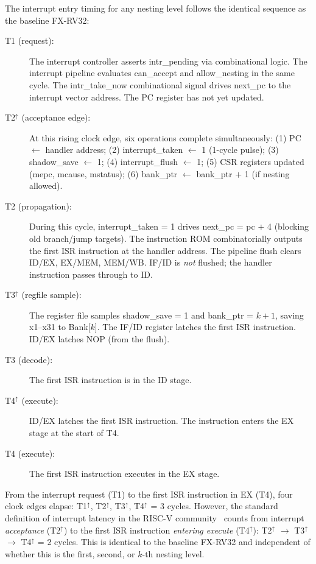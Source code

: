 \documentclass[letterpaper,journal]{IEEEtran}
\begin{document}
The interrupt entry timing for any nesting level follows the identical sequence as the baseline FX-RV32:

\begin{description}
\item[T1 (request):] The interrupt controller asserts intr\_pending via combinational logic. The interrupt pipeline evaluates can\_accept and allow\_nesting in the same cycle. The intr\_take\_now combinational signal drives next\_pc to the interrupt vector address. The PC register has not yet updated.

\item[T2$^\uparrow$ (acceptance edge):] At this rising clock edge, six operations complete simultaneously: (1) PC $\leftarrow$ handler address; (2) interrupt\_taken $\leftarrow$ 1 (1-cycle pulse); (3) shadow\_save $\leftarrow$ 1; (4) interrupt\_flush $\leftarrow$ 1; (5) CSR registers updated (mepc, mcause, mstatus); (6) bank\_ptr $\leftarrow$ bank\_ptr $+$ 1 (if nesting allowed).

\item[T2 (propagation):] During this cycle, interrupt\_taken = 1 drives next\_pc = pc $+$ 4 (blocking old branch/jump targets). The instruction ROM combinatorially outputs the first ISR instruction at the handler address. The pipeline flush clears ID/EX, EX/MEM, MEM/WB. IF/ID is \emph{not} flushed; the handler instruction passes through to ID.

\item[T3$^\uparrow$ (regfile sample):] The register file samples shadow\_save = 1 and bank\_ptr = $k+1$, saving x1--x31 to Bank[$k$]. The IF/ID register latches the first ISR instruction. ID/EX latches NOP (from the flush).

\item[T3 (decode):] The first ISR instruction is in the ID stage.

\item[T4$^\uparrow$ (execute):] ID/EX latches the first ISR instruction. The instruction enters the EX stage at the start of T4.

\item[T4 (execute):] The first ISR instruction executes in the EX stage.
\end{description}

From the interrupt request (T1) to the first ISR instruction in EX (T4), four clock edges elapse: T1$^\uparrow$, T2$^\uparrow$, T3$^\uparrow$, T4$^\uparrow$ = 3 cycles.
However, the standard definition of interrupt latency in the RISC-V community~\cite{ref1,ref2,ref5} counts from interrupt \emph{acceptance} (T2$^\uparrow$) to the first ISR instruction \emph{entering execute} (T4$^\uparrow$): T2$^\uparrow$ $\rightarrow$ T3$^\uparrow$ $\rightarrow$ T4$^\uparrow$ = 2 cycles.
This is identical to the baseline FX-RV32 and independent of whether this is the first, second, or $k$-th nesting level.
\end{document}
